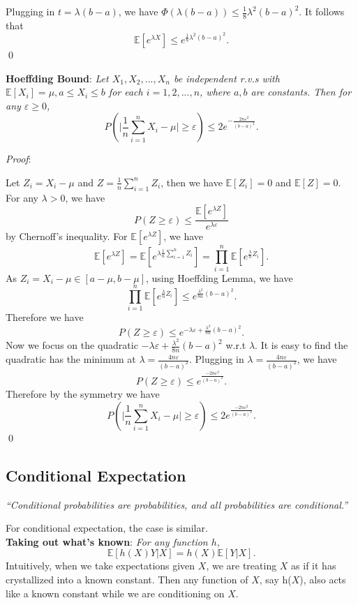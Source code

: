 \documentclass{progartcn}
\begin{document}
			Plugging in $t=\lambda(b-a)$, we have $\Phi(\lambda(b-a))\le \frac{1}{8}\lambda^2(b-a)^2$. It follows that
			\[\mathbb{E}[e^{\lambda X}]\le e^{\frac{1}{8}\lambda^2(b-a)^2}.\]
			\qed

		\textbf{Hoeffding Bound}: \textit{Let $X_1,X_2,...,X_n$ be independent r.v.s with $\mathbb{E}[X_i]=\mu,a\le X_i\le b$ for each $i=1,2,...,n$, where $a, b$ are constants. Then for any $\varepsilon\ge 0$,}
			\[P\left(\bigg\vert \frac{1}{n}\sum_{i=1}^n X_i-\mu\bigg\vert\ge \varepsilon\right)\le 2e^{-\frac{2n\varepsilon^2}{(b-a)^2}}.\]

			\textit{Proof}:

			Let $Z_i=X_i-\mu$ and $Z=\frac{1}{n}\sum_{i=1}^n Z_i$, then we have $\mathbb{E}[Z_i]=0$ and $\mathbb{E}[Z]=0$. For any $\lambda>0$, we have
			\[P(Z\ge \varepsilon)\le \frac{\mathbb{E}[e^{\lambda Z}]}{e^{\lambda \varepsilon}}\]
			by Chernoff's inequality. For $\mathbb{E}[e^{\lambda Z}]$, we have
			\[\mathbb{E}[e^{\lambda Z}]=\mathbb{E}[e^{\lambda \frac{1}{n}\sum_{i=1}^n Z_i}]=\prod_{i=1}^n \mathbb{E}[e^{\frac{\lambda}{n}Z_i}].\]
			As $Z_i=X_i-\mu \in [a-\mu,b-\mu]$, using Hoeffding Lemma, we have
			\[\prod_{i=1}^n \mathbb{E}[e^{\frac{\lambda}{n}Z_i}]\le e^{\frac{\lambda^2}{8n}(b-a)^2}.\]
			Therefore we have
			\[P(Z\ge\varepsilon)\le e^{-\lambda\varepsilon+\frac{\lambda^2}{8n}(b-a)^2}.\]
			Now we focus on the quadratic $-\lambda\varepsilon+\frac{\lambda^2}{8n}(b-a)^2$ w.r.t $\lambda$. It is easy to find the quadratic has the minimum at $\lambda=\frac{4n\varepsilon}{(b-a)^2}$. Plugging in $\lambda=\frac{4n\varepsilon}{(b-a)^2}$, we have
			\[P(Z\ge\varepsilon)\le e^{\frac{-2n\varepsilon^2}{(b-a)^2}}.\]
			Therefore by the symmetry we have
			\[P\left(\bigg\vert \frac{1}{n}\sum_{i=1}^n X_i-\mu\bigg\vert\ge \varepsilon\right)\le2e^{\frac{-2n\varepsilon^2}{(b-a)^2}}.\]
			\qed

	\subsection{Conditional Expectation}

		\textit{``Conditional probabilities are probabilities, and all probabilities are conditional.''}

		For conditional expectation, the case is similar.\\

		\textbf{Taking out what's known}: \textit{For any function $h$,}
			\[\mathbb{E}[h(X)Y|X]=h(X)\mathbb{E}[Y|X].\]
			Intuitively, when we take expectations given $X$, we are treating $X$ as if it has crystallized into a known constant. Then any function of $X$, say h($X$), also acts like a known constant while we are conditioning on $X$.\\
\end{document}
